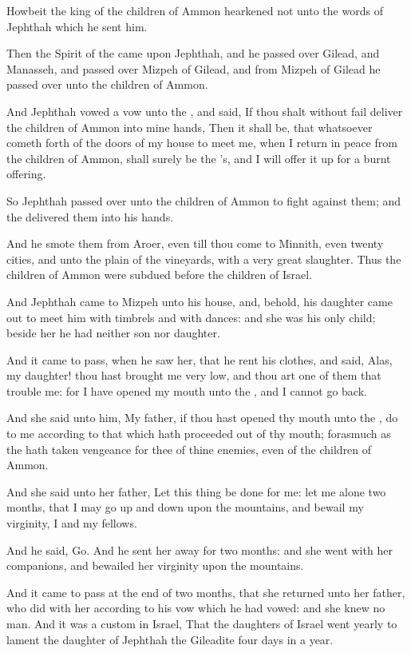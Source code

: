 \Verse Howbeit the king of the children of Ammon hearkened not unto the words of Jephthah which he sent him.

\Verse Then the Spirit of the \LORD came upon Jephthah, and he passed over Gilead, and Manasseh, and passed over Mizpeh of Gilead, and from Mizpeh of Gilead he passed over unto the children of Ammon.

\Verse And Jephthah vowed a vow unto the \LORD, and said, If thou shalt without fail deliver the children of Ammon into mine hands, \Verse Then it shall be, that whatsoever cometh forth of the doors of my house to meet me, when I return in peace from the children of Ammon, shall surely be the \LORD's, and I will offer it up for a burnt offering.

\Verse So Jephthah passed over unto the children of Ammon to fight against them; and the \LORD delivered them into his hands.

\Verse And he smote them from Aroer, even till thou come to Minnith, even twenty cities, and unto the plain of the vineyards, with a very great slaughter. Thus the children of Ammon were subdued before the children of Israel.

\Verse And Jephthah came to Mizpeh unto his house, and, behold, his daughter came out to meet him with timbrels and with dances: and she was his only child; beside her he had neither son nor daughter.

\Verse And it came to pass, when he saw her, that he rent his clothes, and said, Alas, my daughter! thou hast brought me very low, and thou art one of them that trouble me: for I have opened my mouth unto the \LORD, and I cannot go back.

\Verse And she said unto him, My father, if thou hast opened thy mouth unto the \LORD, do to me according to that which hath proceeded out of thy mouth; forasmuch as the \LORD hath taken vengeance for thee of thine enemies, even of the children of Ammon.

\Verse And she said unto her father, Let this thing be done for me: let me alone two months, that I may go up and down upon the mountains, and bewail my virginity, I and my fellows.

\Verse And he said, Go. And he sent her away for two months: and she went with her companions, and bewailed her virginity upon the mountains.

\Verse And it came to pass at the end of two months, that she returned unto her father, who did with her according to his vow which he had vowed: and she knew no man. And it was a custom in Israel, \Verse That the daughters of Israel went yearly to lament the daughter of Jephthah the Gileadite four days in a year.


